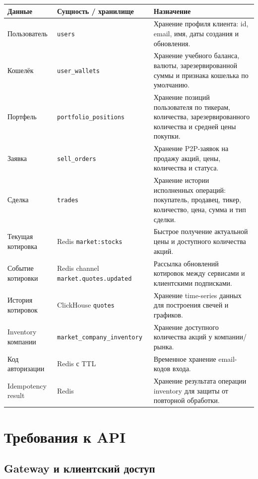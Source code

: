 \documentclass[12pt,a4paper]{article}
\begin{document}
\begin{longtable}{p{3cm}p{5cm}p{7cm}}
\toprule
\textbf{Данные} & \textbf{Сущность / хранилище} & \textbf{Назначение} \\
\midrule
\endhead
Пользователь & \texttt{users} & Хранение профиля клиента: id, email, имя, даты создания и обновления. \\
Кошелёк & \texttt{user\_wallets} & Хранение учебного баланса, валюты, зарезервированной суммы и признака кошелька по умолчанию. \\
Портфель & \texttt{portfolio\_positions} & Хранение позиций пользователя по тикерам, количества, зарезервированного количества и средней цены покупки. \\
Заявка & \texttt{sell\_orders} & Хранение P2P-заявок на продажу акций, цены, количества и статуса. \\
Сделка & \texttt{trades} & Хранение истории исполненных операций: покупатель, продавец, тикер, количество, цена, сумма и тип сделки. \\
Текущая котировка & Redis \texttt{market:stocks} & Быстрое получение актуальной цены и доступного количества акций. \\
Событие котировки & Redis channel \texttt{market.quotes.updated} & Рассылка обновлений котировок между сервисами и клиентскими подписками. \\
История котировок & ClickHouse \texttt{quotes} & Хранение time-series данных для построения свечей и графиков. \\
Inventory компании & \texttt{market\_company\_inventory} & Хранение доступного количества акций у компании/рынка. \\
Код авторизации & Redis с TTL & Временное хранение email-кодов входа. \\
Idempotency result & Redis & Хранение результата операции inventory для защиты от повторной обработки. \\
\bottomrule
\end{longtable}

\section{Требования к API}

\subsection{Gateway и клиентский доступ}
\end{document}

